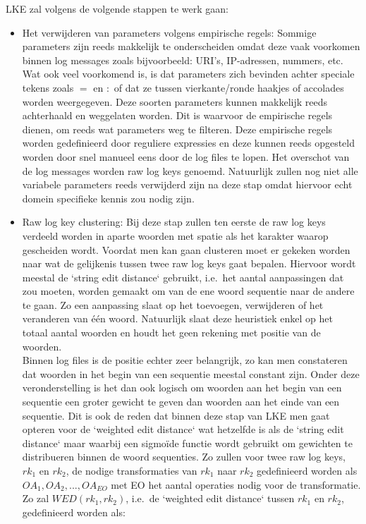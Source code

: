 LKE zal volgens de volgende stappen te werk gaan:
\begin{itemize}
    \item Het verwijderen van parameters volgens empirische regels: Sommige parameters zijn reeds makkelijk te onderscheiden omdat deze vaak voorkomen binnen log messages zoals bijvoorbeeld: URI's, IP-adressen, nummers, etc. Wat ook veel voorkomend is, is dat parameters zich bevinden achter speciale tekens zoals $=$ en $:$ of dat ze tussen vierkante/ronde haakjes of accolades worden weergegeven. Deze soorten parameters kunnen makkelijk reeds achterhaald en weggelaten worden. Dit is waarvoor de empirische regels dienen, om reeds wat parameters weg te filteren. Deze empirische regels worden gedefinieerd door reguliere expressies en deze kunnen reeds opgesteld worden door snel manueel eens door de log files te lopen. Het overschot van de log messages worden raw log keys genoemd. Natuurlijk zullen nog niet alle variabele parameters reeds verwijderd zijn na deze stap omdat hiervoor echt domein specifieke kennis zou nodig zijn.\\
    
    \item Raw log key clustering: Bij deze stap zullen ten eerste de raw log keys verdeeld worden in aparte woorden met spatie als het karakter waarop gescheiden wordt. Voordat men kan gaan clusteren moet er gekeken worden naar wat de gelijkenis tussen twee raw log keys gaat bepalen. Hiervoor wordt meestal de `string edit distance` gebruikt, i.e.\ het aantal aanpassingen dat zou moeten, worden gemaakt om van de ene woord sequentie naar de andere te gaan. Zo een aanpassing slaat op het toevoegen, verwijderen of het veranderen van één woord. Natuurlijk slaat deze heuristiek enkel op het totaal aantal woorden en houdt het geen rekening met positie van de woorden.\\
    
    Binnen log files is de positie echter zeer belangrijk, zo kan men constateren dat woorden in het begin van een sequentie meestal constant zijn. Onder deze veronderstelling is het dan ook logisch om woorden aan het begin van een sequentie een groter gewicht te geven dan woorden aan het einde van een sequentie. Dit is ook de reden dat binnen deze stap van LKE men gaat opteren voor de `weighted edit distance` wat hetzelfde is als de `string edit distance` maar waarbij een sigmoïde functie wordt gebruikt om gewichten te distribueren binnen de woord sequenties. Zo zullen voor twee raw log keys, \(rk_{1}\) en \(rk_{2}\), de nodige transformaties van \(rk_{1}\) naar \(rk_{2}\) gedefinieerd worden als \(OA_{1}, OA_{2}, ..., OA_{EO}\) met EO het aantal operaties nodig voor de transformatie. Zo zal \(WED(rk_{1}, rk_{2})\), i.e.\ de `weighted edit distance` tussen \(rk_{1}\) en \(rk_{2}\), gedefinieerd worden als:
    

\end{itemize}
